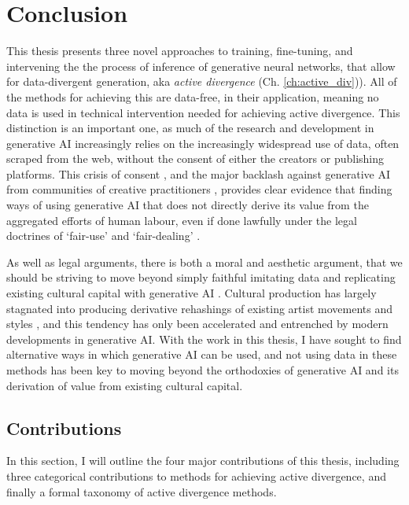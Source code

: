 \chapter{Conclusion}
\label{ch:conclusion}

This thesis presents three novel approaches to training, fine-tuning, and intervening the the process of inference of generative neural networks, that allow for data-divergent generation, aka \textit{active divergence} (Ch. \ref{ch:active_div})).
All of the methods for achieving this are data-free, in their application, meaning no data is used in technical intervention needed for achieving active divergence.
This distinction is an important one, as much of the research and development in generative AI increasingly relies on the increasingly widespread use of data, often scraped from the web, without the consent of either the creators or publishing platforms.
This crisis of consent \citep{longpre2024consent}, and the major backlash against generative AI from communities of creative practitioners \citep{whiddington2022backlash}, provides clear evidence that finding ways of using generative AI that does not directly derive its value from the aggregated efforts of human labour, even if done lawfully under the legal doctrines of `fair-use' \citep{sobel2017artificial,alhadeff2024limits} and `fair-dealing' \citep{guadamuz2023scanner}.

As well as legal arguments, there is both a moral and aesthetic argument, that we should be striving to move beyond simply faithful imitating data and replicating existing cultural capital with generative AI \citep{rafferty2016future}. 
Cultural production has largely stagnated into producing derivative rehashings of existing artist movements and styles \citep{fisher2009capitalist}, and this tendency has only been accelerated and entrenched by modern developments in generative AI.
With the work in this thesis, I have sought to find alternative ways in which generative AI can be used, and not using data in these methods has been key to moving beyond the orthodoxies of generative AI and its derivation of value from existing cultural capital.

\section{Contributions}

In this section, I will outline the four major contributions of this thesis, including three categorical contributions to methods for achieving active divergence, and finally a formal taxonomy of active divergence methods.

